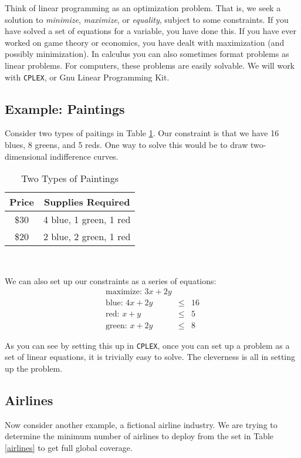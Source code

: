 \documentclass[12pt,letter]{article}
\begin{document}
Think of linear programming as an optimization problem. That is, we
seek a solution to \emph{minimize}, \emph{maximize}, or
\emph{equality}, subject to some constraints. If you have solved a set
of equations for a variable, you have done this. If you have ever
worked on game theory or economics, you have dealt with maximization
(and possibly minimization). In calculus you can also sometimes format
problems as linear problems. For computers, these problems are easily
solvable. We will work with \texttt{CPLEX}, or Gnu Linear Programming
Kit. 

\subsection{Example: Paintings}
Consider two types of paitings in Table \ref{paintings}. Our
constraint is that we have 16 blues, 8 greens, and 5 reds. One way to
solve this would be to draw two-dimensional indifference curves. 

\begin{table}[h!]\centering
 \caption{Two Types of Paintings}
\label{paintings}
\begin{tabular}{cc}\hline
Price & Supplies Required \\
\hline
\$30 & 4 blue, 1 green, 1 red \\
\$20 & 2 blue, 2 green, 1 red \\
\hline
\end{tabular} \\
\end{table}

We can also set up our constraints as a series of equations:
\begin{eqnarray*}
\text{maximize:  } 3x + 2y \\
\text{blue:  } 4x + 2y  &\leq& 16 \\
\text{red:  } x + y  &\leq& 5 \\
\text{green:  } x + 2y  &\leq& 8 
\end{eqnarray*}

As you can see by setting this up in \texttt{CPLEX}, once you can set
up a problem as a set of linear equations, it is trivially easy to
solve. The cleverness is all in setting up the problem.\footnotemark
{}


\subsection{Airlines}
Now consider another example, a fictional airline industry. We are
trying to determine the minimum number of airlines to deploy from the
set in Table \ref{airlines} to get full global coverage. \footnotemark
{}
\end{document}
